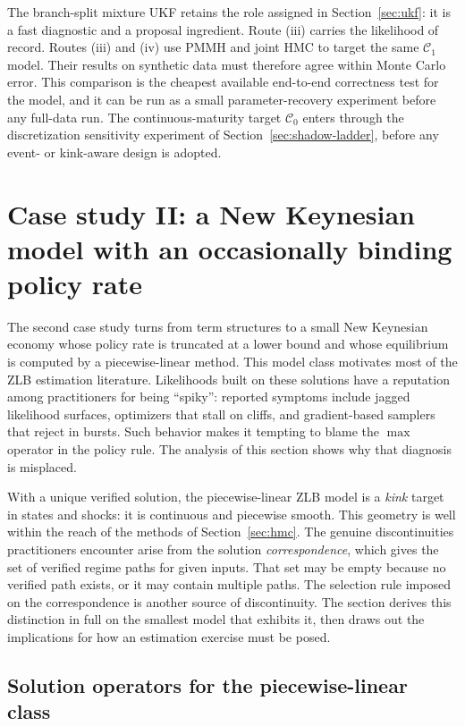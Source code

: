 \documentclass[11pt]{article}
\begin{document}
The branch-split mixture UKF retains the role assigned in Section~\ref{sec:ukf}: it is a fast diagnostic and a proposal ingredient. Route (iii) carries the likelihood of record. Routes (iii) and (iv) use PMMH and joint HMC to target the same \(\mathcal C_1\) model. Their results on synthetic data must therefore agree within Monte Carlo error. This comparison is the cheapest available end-to-end correctness test for the model, and it can be run as a small parameter-recovery experiment before any full-data run. The continuous-maturity target \(\mathcal C_0\) enters through the discretization sensitivity experiment of Section~\ref{sec:shadow-ladder}, before any event- or kink-aware design is adopted.

\section{Case study II: a New Keynesian model with an occasionally binding policy rate}
\label{sec:nk}

The second case study turns from term structures to a small New Keynesian economy whose policy rate is truncated at a lower bound and whose equilibrium is computed by a piecewise-linear method. This model class motivates most of the ZLB estimation literature. Likelihoods built on these solutions have a reputation among practitioners for being ``spiky'': reported symptoms include jagged likelihood surfaces, optimizers that stall on cliffs, and gradient-based samplers that reject in bursts. Such behavior makes it tempting to blame the $\max$ operator in the policy rule. The analysis of this section shows why that diagnosis is misplaced.

With a unique verified solution, the piecewise-linear ZLB model is a \emph{kink} target in states and shocks: it is continuous and piecewise smooth. This geometry is well within the reach of the methods of Section~\ref{sec:hmc}. The genuine discontinuities practitioners encounter arise from the solution \emph{correspondence}, which gives the set of verified regime paths for given inputs. That set may be empty because no verified path exists, or it may contain multiple paths. The selection rule imposed on the correspondence is another source of discontinuity. The section derives this distinction in full on the smallest model that exhibits it, then draws out the implications for how an estimation exercise must be posed.

\subsection{Solution operators for the piecewise-linear class}
\label{sec:nk-solvers}
\end{document}

